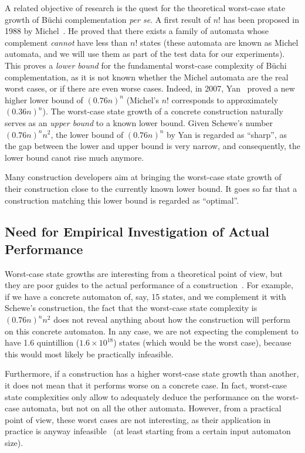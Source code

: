 A related objective of research is the quest for the theoretical worst-case state growth of Büchi complementation \textit{per se}. A first result of $n!$ has been proposed in 1988 by Michel~\cite{michel1988}. He proved that there exists a family of automata whose complement \textit{cannot} have less than $n!$ states (these automata are known as Michel automata, and we will use them as part of the test data for our experiments). This proves a \textit{lower bound} for the fundamental worst-case complexity of Büchi complementation, as it is not known whether the Michel automata are the real worst cases, or if there are even worse cases. Indeed, in 2007, Yan~\cite{DBLP:journals/corr/abs-0802-1226} proved a new higher lower bound of $(0.76n)^n$ (Michel's $n!$ corresponds to approximately $(0.36n)^n$). The worst-case state growth of a concrete construction naturally serves as an \textit{upper bound} to a known lower bound. Given Schewe's number $(0.76n)^n n^2$, the lower bound of $(0.76n)^n$ by Yan is regarded as ``sharp'', as the gap between the lower and upper bound is very narrow, and consequently, the lower bound canot rise much anymore.

Many construction developers aim at bringing the worst-case state growth of their construction close to the currently known lower bound. It goes so far that a construction matching this lower bound is regarded as ``optimal''. 


\subsection{Need for Empirical Investigation of Actual Performance}
Worst-case state growths are interesting from a theoretical point of view, but they are poor guides to the actual performance of a construction~\cite{2011_tsai}. For example, if we have a concrete automaton of, say, 15 states, and we complement it with Schewe's construction, the fact that the worst-case state complexity is $(0.76n)^n n^2$ does not reveal anything about how the construction will perform on this concrete automaton. In any case, we are not expecting the complement to have 1.6 quintillion ($1.6 \times 10^{18}$) states (which would be the worst case), because this would most likely be practically infeasible.

Furthermore, if a construction has a higher worst-case state growth than another, it does not mean that it performs worse on a concrete case. In fact, worst-case state complexities only allow to adequately deduce the performance on the worst-case automata, but not on all the other automata. However, from a practical point of view, these worst cases are not interesting, as their application in practice is anyway infeasible~\cite{1995_tasiran} (at least starting from a certain input automaton size).

